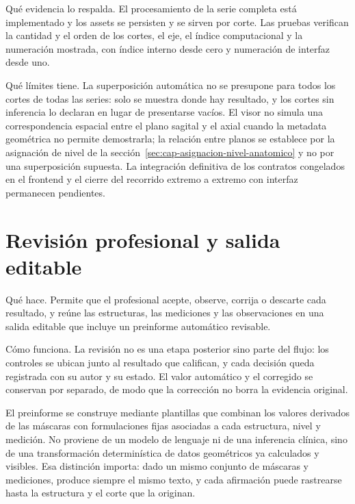 Qué evidencia lo respalda. El procesamiento de la serie completa está implementado y los assets se persisten y se sirven por corte. Las pruebas verifican la cantidad y el orden de los cortes, el eje, el índice computacional y la numeración mostrada, con índice interno desde cero y numeración de interfaz desde uno.

Qué límites tiene. La superposición automática no se presupone para todos los cortes de todas las series: solo se muestra donde hay resultado, y los cortes sin inferencia lo declaran en lugar de presentarse vacíos. El visor no simula una correspondencia espacial entre el plano sagital y el axial cuando la metadata geométrica no permite demostrarla; la relación entre planos se establece por la asignación de nivel de la sección~\ref{sec:cap-asignacion-nivel-anatomico} y no por una superposición supuesta. La integración definitiva de los contratos congelados en el frontend y el cierre del recorrido extremo a extremo con interfaz permanecen pendientes.

\section{Revisión profesional y salida editable}

Qué hace. Permite que el profesional acepte, observe, corrija o descarte cada resultado, y reúne las estructuras, las mediciones y las observaciones en una salida editable que incluye un preinforme automático revisable.

Cómo funciona. La revisión no es una etapa posterior sino parte del flujo: los controles se ubican junto al resultado que califican, y cada decisión queda registrada con su autor y su estado. El valor automático y el corregido se conservan por separado, de modo que la corrección no borra la evidencia original.

El preinforme se construye mediante plantillas que combinan los valores derivados de las máscaras con formulaciones fijas asociadas a cada estructura, nivel y medición. No proviene de un modelo de lenguaje ni de una inferencia clínica, sino de una transformación determinística de datos geométricos ya calculados y visibles. Esa distinción importa: dado un mismo conjunto de máscaras y mediciones, produce siempre el mismo texto, y cada afirmación puede rastrearse hasta la estructura y el corte que la originan.

